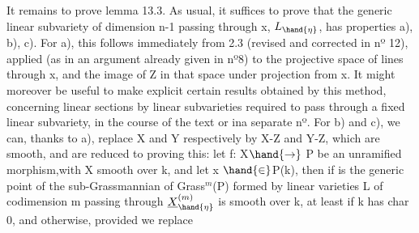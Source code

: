 
It remains to prove lemma 13.3. As usual, it suffices to prove
that the generic linear subvariety of dimension n-1 passing through x,
$L_{\hand{\eta}}$, has properties a), b), c). For a),  this follows 
immediately from 2.3 (revised and corrected in nº 12), applied (as in an
argument already given in nº8) to the projective space of lines
through x, and the image of Z in that space under projection from
x. \hand{[}It might moreover be useful to make explicit certain
 results obtained by this method, concerning linear sections
by linear subvarieties required to pass through a fixed linear
subvariety, in the course of the text or in\hand{/}a separate nº\hand{]}. For  b) and c),
 we can, thanks to a), replace X and Y respectively by X-Z and Y-Z,
which are smooth, and are reduced to proving this: let f: X$\hand{\rightarrow}$ P be an
unramified morphism,\hand{(}with X smooth over k, and let x $\hand{\in}$P(k), then if
\hand{$\eta$} is the generic point of  the sub-Grassmannian of Grass$^{m}$(P)
formed by linear varieties L of codimension m passing through  
  $\underline{X}^{(m)}_{\hand{\eta}}$ is smooth over k, at
 least if k has char 0, and otherwise, provided we replace
